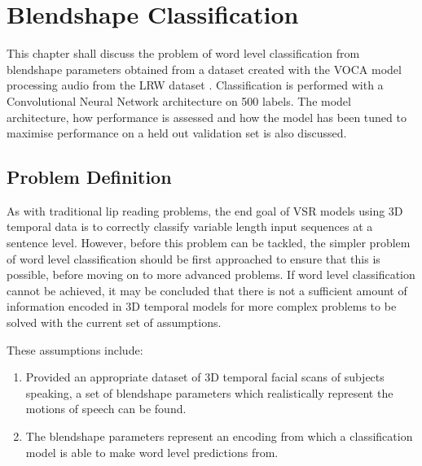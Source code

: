 %
%
%
%
%



\chapter{Blendshape Classification}

This chapter shall discuss the problem of word level classification from blendshape parameters obtained from a dataset created with the VOCA model \cite{Cudeiro2019} processing audio from the LRW dataset \cite{Chung2016}.
Classification is performed with a Convolutional Neural Network architecture on 500 labels.
The model architecture, how performance is assessed and how the model has been tuned to maximise performance on a held out validation set is also discussed. 

\section{Problem Definition}
As with traditional lip reading problems, the end goal of VSR models using 3D temporal data is to correctly classify variable length input sequences at a sentence level.
However, before this problem can be tackled, the simpler problem of word level classification should be first approached to ensure that this is possible, before moving on to more advanced problems.
If word level classification cannot be achieved, it may be concluded that there is not a sufficient amount of information encoded in 3D temporal models for more complex problems to be solved with the current set of assumptions.

These assumptions include:
\begin{enumerate}
    \item Provided an appropriate dataset of 3D temporal facial scans of subjects speaking, a set of blendshape parameters which realistically represent the motions of speech can be found. \label{assumption:class_1}
    \item The blendshape parameters represent an encoding from which a classification model is able to make word level predictions from. \label{assumption:class_2}
\end{enumerate}

